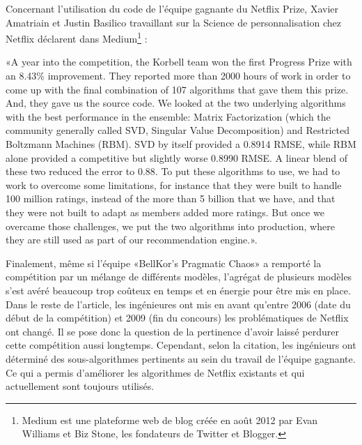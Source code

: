 \vspace{5mm} 

Concernant l'utilisation du code de l'équipe gagnante du Netflix Prize,  Xavier Amatriain et Justin Basilico travaillant sur la Science de personnalisation chez Netflix déclarent\supercite{ResultPrize} dans Medium\footnote{Medium est une plateforme web de blog créée en août 2012 par Evan Williams et Biz Stone, les fondateurs de Twitter et Blogger. } : 

\vspace{5mm} 

«A year into the competition, the Korbell team won the first Progress Prize with an 8.43\% improvement. They reported more than 2000 hours of work in order to come up with the final combination of 107 algorithms that gave them this prize. And, they gave us the source code. We looked at the two underlying algorithms with the best performance in the ensemble: Matrix Factorization (which the community generally called SVD, Singular Value Decomposition) and Restricted Boltzmann Machines (RBM). SVD by itself provided a 0.8914 RMSE, while RBM alone provided a competitive but slightly worse 0.8990 RMSE. A linear blend of these two reduced the error to 0.88. To put these algorithms to use, we had to work to overcome some limitations, for instance that they were built to handle 100 million ratings, instead of the more than 5 billion that we have, and that they were not built to adapt as members added more ratings. But once we overcame those challenges, we put the two algorithms into production, where they are still used as part of our recommendation engine.».

\vspace{5mm}

Finalement, même si l'équipe «BellKor's Pragmatic Chaos» a remporté la compétition par un mélange de différents modèles, l'agrégat de plusieurs modèles s'est avéré beaucoup trop coûteux en temps et en énergie pour être mis en place. Dans le reste de l'article, les ingénieures ont mis en avant qu'entre 2006 (date du début de la compétition) et 2009 (fin du concours) les problématiques de Netflix ont changé. Il se pose donc la question de la pertinence d'avoir laissé perdurer cette compétition aussi longtemps. Cependant, selon la citation, les ingénieurs ont déterminé des sous-algorithmes pertinents au sein du travail de l'équipe gagnante. Ce qui a permis d'améliorer les algorithmes de Netflix existants et qui actuellement sont toujours utilisés. 
